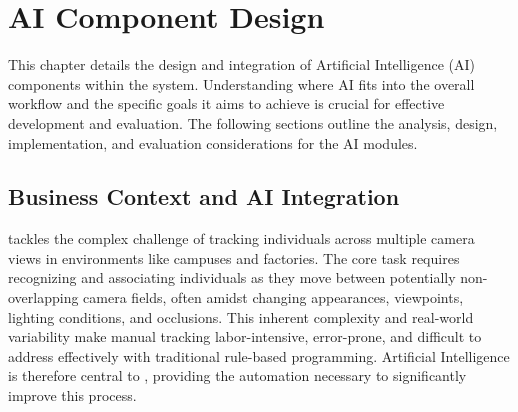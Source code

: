 \chapter{AI Component Design}
\label{chap:ai-component-design}

This chapter details the design and integration of Artificial Intelligence (AI) components within the \usevar{\srsTitle} system. Understanding where AI fits into the overall workflow and the specific goals it aims to achieve is crucial for effective development and evaluation. The following sections outline the analysis, design, implementation, and evaluation considerations for the AI modules.

\section{Business Context and AI Integration}
\label{section:ai-integration-context}

\usevar{\srsTitle} tackles the complex challenge of tracking individuals across multiple camera views in environments like campuses and factories. The core task requires recognizing and associating individuals as they move between potentially non-overlapping camera fields, often amidst changing appearances, viewpoints, lighting conditions, and occlusions. This inherent complexity and real-world variability make manual tracking labor-intensive, error-prone, and difficult to address effectively with traditional rule-based programming. Artificial Intelligence is therefore central to \usevar{\srsTitle}, providing the automation necessary to significantly improve this process.

